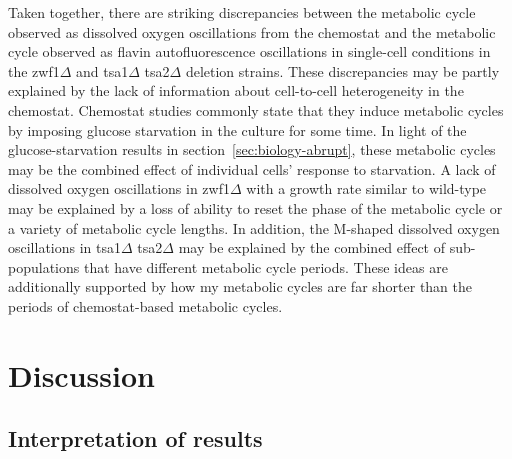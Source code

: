 Taken together, there are striking discrepancies between the metabolic cycle observed as dissolved oxygen oscillations from the chemostat and the metabolic cycle observed as flavin autofluorescence oscillations in single-cell conditions in the zwf1$\Delta$ and tsa1$\Delta$ tsa2$\Delta$ deletion strains.
These discrepancies may be partly explained by the lack of information about cell-to-cell heterogeneity in the chemostat.
Chemostat studies commonly state that they induce metabolic cycles by imposing glucose starvation in the culture for some time.
In light of the glucose-starvation results in section~\ref{sec:biology-abrupt}, these metabolic cycles may be the combined effect of individual cells' response to starvation.
A lack of dissolved oxygen oscillations in zwf1$\Delta$ with a growth rate similar to wild-type \parencite{tuCyclicChangesMetabolic2007} may be explained by a loss of ability to reset the phase of the metabolic cycle or a variety of metabolic cycle lengths.
In addition, the M-shaped dissolved oxygen oscillations in tsa1$\Delta$ tsa2$\Delta$ may be explained by the combined effect of sub-populations that have different metabolic cycle periods.
These ideas are additionally supported by how my metabolic cycles are far shorter than the periods of chemostat-based metabolic cycles.

\section{Discussion}
\label{sec:biology-discussion}

\subsection{Interpretation of results}
\label{subsec:biology-discussion-interpretation}


